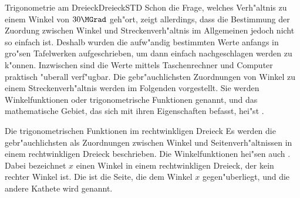 \begin{MXContent}{Trigonometrie am Dreieck}{Dreieck}{STD}
Schon die Frage, welches Verh"altnis zu einem Winkel von $30\MGrad$ geh"ort,
zeigt allerdings, dass die Bestimmung der Zuordung zwischen Winkel und 
Streckenverh"altnis im Allgemeinen jedoch nicht so einfach ist.
Deshalb wurden die aufw"andig bestimmten Werte anfangs in gro"sen Tafelwerken 
aufgeschrieben, um dann einfach nachgeschlagen werden zu k"onnen.
Inzwischen sind die Werte mittels Taschenrechner und Computer praktisch 
"uberall verf"ugbar. Die gebr"auchlichsten Zuordnungen von Winkel zu einem 
Streckenverh"altnis werden im Folgenden vorgestellt. 
Sie werden Winkelfunktionen oder trigonometrische Funktionen genannt, und 
das mathematische Gebiet, das sich mit ihren Eigenschaften befasst, hei"st
.

\begin{MXInfo}{Die trigonometrischen Funktionen im rechtwinkligen Dreieck}%
%
Es werden die gebr"auchlichsten 
als Zuordnungen zwischen Winkel und Seitenverh"altnissen in einem rechtwinkligen 
Dreieck beschrieben. Die Winkelfunktionen hei"sen auch 
.
Dabei bezeichnet $x$ einen Winkel in einem rechtwinkligen Dreieck, der 
kein rechter Winkel ist.
Die  ist die Seite, die dem Winkel $x$ 
gegen"uberliegt, und die andere Kathete wird  
genannt.

\begin{center}
\end{center}


\end{MXInfo}
\end{MXContent}
